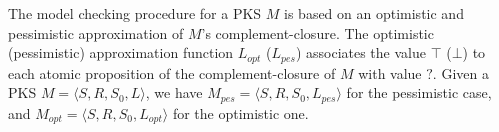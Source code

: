 %


The model checking procedure for a PKS $M$ is based on an optimistic and pessimistic approximation of $M$'s complement-closure.
The optimistic (pessimistic) approximation function $L_{opt}$  ($L_{pes}$) associates the value $\top$ ($\bot$) to each atomic proposition of the complement-closure of $M$ with value $?$.
Given a PKS $M=\langle S,R, S_0, L \rangle$, we have $M_{pes}=\langle S,R, S_0, L_{pes} \rangle$ for the pessimistic case, and $M_{opt}=\langle S,R, S_0, L_{opt} \rangle$ for the optimistic one.
%

